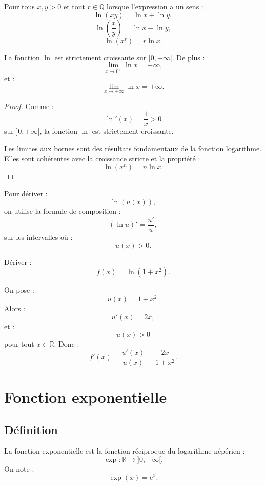 \documentclass[11pt,a4paper]{article}
\newcommand{\Q}{\mathbb Q}
\newcommand{\R}{\mathbb R}
\newcommand{\e}{\mathrm e}
\begin{document}
\begin{theorembox}
Pour tous \(x,y>0\) et tout \(r\in\Q\) lorsque l'expression a un sens :
\[
\ln(xy)=\ln x+\ln y,
\]
\[
\ln\left(\frac{x}{y}\right)=\ln x-\ln y,
\]
\[
\ln(x^r)=r\ln x.
\]
\end{theorembox}

\begin{theorembox}
La fonction \(\ln\) est strictement croissante sur \(]0,+\infty[\).  
De plus :
\[
\lim_{x\to0^+}\ln x=-\infty,
\]
et :
\[
\lim_{x\to+\infty}\ln x=+\infty.
\]
\end{theorembox}

\begin{proof}
Comme :
\[
\ln'(x)=\frac1x>0
\]
sur \(]0,+\infty[\), la fonction \(\ln\) est strictement croissante.

Les limites aux bornes sont des résultats fondamentaux de la fonction logarithme.  
Elles sont cohérentes avec la croissance stricte et la propriété :
\[
\ln(x^n)=n\ln x.
\]
\end{proof}

\begin{methodbox}
Pour dériver :
\[
\ln(u(x)),
\]
on utilise la formule de composition :
\[
(\ln u)'=\frac{u'}{u},
\]
sur les intervalles où :
\[
u(x)>0.
\]
\end{methodbox}

\begin{exercicebox}[Logarithme]
Dériver :
\[
f(x)=\ln(1+x^2).
\]
\end{exercicebox}

\begin{correctionbox}
On pose :
\[
u(x)=1+x^2.
\]
Alors :
\[
u'(x)=2x,
\]
et :
\[
u(x)>0
\]
pour tout \(x\in\R\).  
Donc :
\[
f'(x)=\frac{u'(x)}{u(x)}
=
\frac{2x}{1+x^2}.
\]
\end{correctionbox}

\section{Fonction exponentielle}

\subsection{Définition}

\begin{definitionbox}[Exponentielle]
La fonction exponentielle est la fonction réciproque du logarithme népérien :
\[
\exp:\R\to]0,+\infty[.
\]
On note :
\[
\exp(x)=\e^x.
\]
\end{definitionbox}
\end{document}
